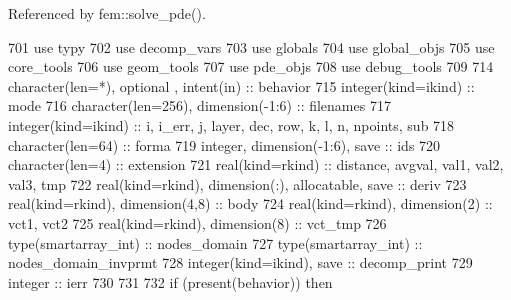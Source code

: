 Referenced by fem\+::solve\+\_\+pde().


\begin{DoxyCode}
701       \textcolor{keywordtype}{use }typy 
702       \textcolor{keywordtype}{use }decomp_vars
703       \textcolor{keywordtype}{use }globals
704       \textcolor{keywordtype}{use }global_objs
705       \textcolor{keywordtype}{use }core_tools
706       \textcolor{keywordtype}{use }geom_tools
707       \textcolor{keywordtype}{use }pde_objs
708       \textcolor{keywordtype}{use }debug_tools
709 
714       \textcolor{keywordtype}{character(len=*)}, \textcolor{keywordtype}{optional} , \textcolor{keywordtype}{intent(in)}               :: behavior
715       \textcolor{keywordtype}{integer(kind=ikind)}                                   :: mode
716       \textcolor{keywordtype}{character(len=256)}, \textcolor{keywordtype}{dimension(-1:6)}                   :: filenames
717       \textcolor{keywordtype}{integer(kind=ikind)}                                   :: i, i\_err,\textcolor{comment}{ j, layer, dec, row, k, l, n, 
      npoints, sub}
718 \textcolor{comment}{      }\textcolor{keywordtype}{character(len=64)}                                     :: forma
719       \textcolor{keywordtype}{integer}, \textcolor{keywordtype}{dimension(-1:6)}, \textcolor{keywordtype}{save}                        :: ids
720       \textcolor{keywordtype}{character(len=4)}                                      :: extension
721       \textcolor{keywordtype}{real(kind=rkind)}                                      :: distance,\textcolor{comment}{ avgval, val1, val2, val3, tmp}
722 \textcolor{comment}{      }\textcolor{keywordtype}{real(kind=rkind)}, \textcolor{keywordtype}{dimension(:)}, \textcolor{keywordtype}{allocatable}, \textcolor{keywordtype}{save}     :: deriv
723       \textcolor{keywordtype}{real(kind=rkind)}, \textcolor{keywordtype}{dimension(4,8)}                      :: body
724       \textcolor{keywordtype}{real(kind=rkind)}, \textcolor{keywordtype}{dimension(2)}                        :: vct1, vct2
725       \textcolor{keywordtype}{real(kind=rkind)}, \textcolor{keywordtype}{dimension(8)}                        :: vct\_tmp
726       \textcolor{keywordtype}{type}(smartarray_int)                                  :: nodes\_domain
727       \textcolor{keywordtype}{type}(smartarray_int)                                  :: nodes\_domain\_invprmt
728       \textcolor{keywordtype}{integer(kind=ikind)}, \textcolor{keywordtype}{save}                             :: decomp\_print
729       \textcolor{keywordtype}{integer} :: ierr
730 
731 
732       \textcolor{keywordflow}{if} (\textcolor{keyword}{present}(behavior)) \textcolor{keywordflow}{then}

\end{DoxyCode}
